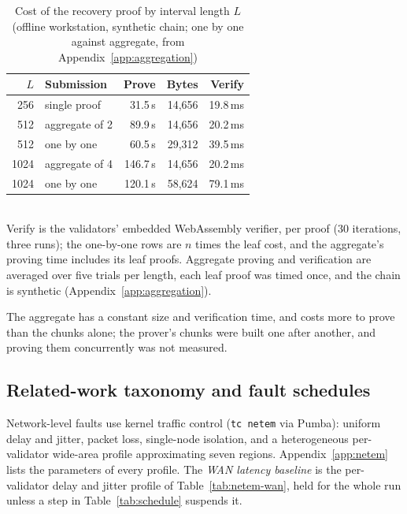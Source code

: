 \begin{table}[tbp]
\caption{Cost of the recovery proof by interval length $L$ (offline workstation,
synthetic chain; one by one against aggregate, from Appendix~\ref{app:aggregation})}
\label{tab:recovery-cost}
\centering
\footnotesize
\begin{tabular}{@{}rlrrr@{}}
\toprule
$L$ & Submission & Prove & Bytes & Verify \\
\midrule
256 & single proof & 31.5\,s & 14{,}656 & 19.8\,ms \\
512 & aggregate of 2 & 89.9\,s & 14{,}656 & 20.2\,ms \\
512 & one by one & 60.5\,s & 29{,}312 & 39.5\,ms \\
1024 & aggregate of 4 & 146.7\,s & 14{,}656 & 20.2\,ms \\
1024 & one by one & 120.1\,s & 58{,}624 & 79.1\,ms \\
\bottomrule
\end{tabular}
\\[2pt]
\footnotesize Verify is the validators' embedded WebAssembly verifier, per proof (30
iterations, three runs); the one-by-one rows are $n$ times the leaf cost, and the
aggregate's proving time includes its leaf proofs. Aggregate proving and verification
are averaged over five trials per length, each leaf proof was timed once, and the chain
is synthetic (Appendix~\ref{app:aggregation}).
\end{table}

The aggregate has a constant size and verification time, and costs more to prove than
the chunks alone; the prover's chunks were built one after another, and proving them
concurrently was not measured.



\subsection*{Related-work taxonomy and fault schedules}




\label{subsec:schedules}

Network-level faults use kernel traffic control (\texttt{tc netem} via
Pumba): uniform delay and jitter, packet loss, single-node isolation, and a
heterogeneous per-validator wide-area profile approximating seven regions.
Appendix~\ref{app:netem} lists the parameters of every profile. The
\emph{WAN latency baseline} is the per-validator delay and jitter profile of
Table~\ref{tab:netem-wan}, held for the whole run unless a step in
Table~\ref{tab:schedule} suspends it.

